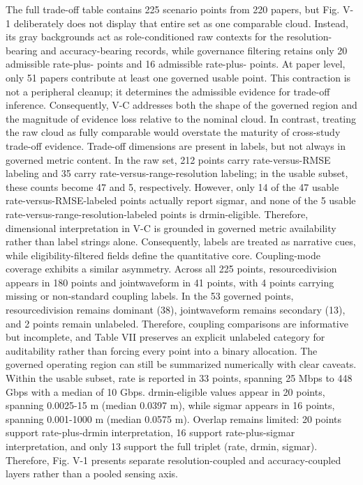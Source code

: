 {}The full trade-off table contains 225 scenario points from 220 papers, but Fig. V-1 deliberately does not display that entire set as one comparable cloud. Instead, its gray backgrounds act as role-conditioned raw contexts for the resolution-bearing and accuracy-bearing records, while governance filtering retains only 20 admissible rate-plus- points and 16 admissible rate-plus- points. At paper level, only 51 papers contribute at least one governed usable point. This contraction is not a peripheral cleanup; it determines the admissible evidence for trade-off inference. Consequently, V-C addresses both the shape of the governed region and the magnitude of evidence loss relative to the nominal cloud. In contrast, treating the raw cloud as fully comparable would overstate the maturity of cross-study trade-off evidence.\markdownRendererParagraphSeparator
{}Trade-off dimensions are present in labels, but not always in governed metric content. In the raw set, 212 points carry rate-versus-RMSE labeling and 35 carry rate-versus-range-resolution labeling; in the usable subset, these counts become 47 and 5, respectively. However, only 14 of the 47 usable rate-versus-RMSE-labeled points actually report sigma\markdownRendererUnderscore{}r, and none of the 5 usable rate-versus-range-resolution-labeled points is drmin-eligible. Therefore, dimensional interpretation in V-C is grounded in governed metric availability rather than label strings alone. Consequently, labels are treated as narrative cues, while eligibility-filtered fields define the quantitative core.\markdownRendererParagraphSeparator
{}Coupling-mode coverage exhibits a similar asymmetry. Across all 225 points, resource\markdownRendererUnderscore{}division appears in 180 points and joint\markdownRendererUnderscore{}waveform in 41 points, with 4 points carrying missing or non-standard coupling labels. In the 53 governed points, resource\markdownRendererUnderscore{}division remains dominant (38), joint\markdownRendererUnderscore{}waveform remains secondary (13), and 2 points remain unlabeled. Therefore, coupling comparisons are informative but incomplete, and Table VII preserves an explicit unlabeled category for auditability rather than forcing every point into a binary allocation.\markdownRendererParagraphSeparator
{}The governed operating region can still be summarized numerically with clear caveats. Within the usable subset, rate is reported in 33 points, spanning 25 Mbps to 448 Gbps with a median of 10 Gbps. drmin-eligible values appear in 20 points, spanning 0.0025-15 m (median 0.0397 m), while sigma\markdownRendererUnderscore{}r appears in 16 points, spanning 0.001-1000 m (median 0.0575 m). Overlap remains limited: 20 points support rate-plus-drmin interpretation, 16 support rate-plus-sigma\markdownRendererUnderscore{}r interpretation, and only 13 support the full triplet (rate, drmin, sigma\markdownRendererUnderscore{}r). Therefore, Fig. V-1 presents separate resolution-coupled and accuracy-coupled layers rather than a pooled sensing axis.\markdownRendererParagraphSeparator
